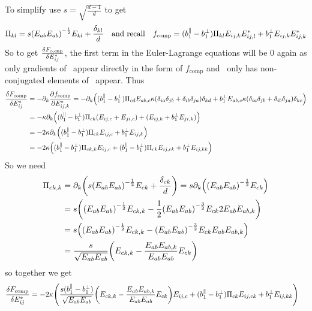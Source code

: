 \documentclass[11pt]{article}
\begin{document}
To simplify use $s=\sqrt{\frac{d-1}{d}}$ to get
\begin{equation}
    \Pi_{kl} = s \qty(E_{ab}E_{ab})^{-\frac{1}{2}}E_{kl} + \frac{\delta_{kl}}{d} \qq{and recall} f_\text{comp} = (b_1^\parallel - b_1^\perp) \Pi_{kl} E_{ij,k}E_{ij,l}^* + b_1^\perp E_{ij,k}E_{ij,k}^*
\end{equation}
So to get $\fdv{F_\text{comp}}{E_{ij}^*}$, the first term in the Euler-Lagrange equations will be 0 again as only gradients of \EE\ appear directly in the form of $f_\text{comp}$ and \PP\ only has non-conjugated elements of \EE\ appear.
Thus
\begin{align}
    \fdv{F_\text{comp}}{E_{ij}^*} &= -\pp_k \pdv{f_\text{comp}}{E_{ij,k}^*} = -\pp_k \qty((b_1^\parallel - b_1^\perp) \Pi_{cd} E_{ab,c} \kappa(\ddelta{i}{j}{a}{b})\delta_{kd} + b_1^\perp E_{ab,c}\kappa(\ddelta{i}{j}{a}{b})\delta_{kc}) \\
    &= -\kappa\pp_k \qty((b_1^\parallel - b_1^\perp) \Pi_{ck} (E_{ij,c} + E_{ji,c}) + (E_{ij,k} + b_1^\perp E_{ji,k})) \\
    &= -2\kappa\pp_k \qty((b_1^\parallel - b_1^\perp) \Pi_{ck} E_{ij,c} + b_1^\perp E_{ij,k}) \\
    &= -2\kappa\qty((b_1^\parallel - b_1^\perp) \Pi_{ck,k} E_{ij,c} + (b_1^\parallel - b_1^\perp) \Pi_{ck} E_{ij,ck} + b_1^\perp E_{ij,kk})
\end{align}
So we need
\begin{align}
    \Pi_{ck,k} &= \partial_k \qty( s \qty(E_{ab}E_{ab})^{-\frac{1}{2}}E_{ck} + \frac{\delta_{ck}}{d}) = s \partial_k \qty( \qty(E_{ab}E_{ab})^{-\frac{1}{2}}E_{ck}) \\
    &= s \qty(\qty(E_{ab}E_{ab})^{-\frac{1}{2}}E_{ck,k} - \frac{1}{2}\qty(E_{ab}E_{ab})^{-\frac{3}{2}}E_{ck}2E_{ab}E_{ab,k}) \\
    &= s \qty(\qty(E_{ab}E_{ab})^{-\frac{1}{2}}E_{ck,k} - \qty(E_{ab}E_{ab})^{-\frac{3}{2}}E_{ck}E_{ab}E_{ab,k}) \\
    &= \frac{s}{\sqrt{E_{ab}E_{ab}}} \qty(E_{ck,k} - \frac{E_{ab}E_{ab,k}}{E_{ab}E_{ab}}E_{ck})
\end{align}
so together we get
\begin{align}
    \fdv{F_\text{comp}}{E_{ij}^*} &= -2\kappa\qty(\frac{s(b_1^\parallel - b_1^\perp)}{\sqrt{E_{ab}E_{ab}}} \qty(E_{ck,k} - \frac{E_{ab}E_{ab,k}}{E_{ab}E_{ab}}E_{ck}) E_{ij,c} + (b_1^\parallel - b_1^\perp) \Pi_{ck} E_{ij,ck} + b_1^\perp E_{ij,kk})
\end{align}
\end{document}
